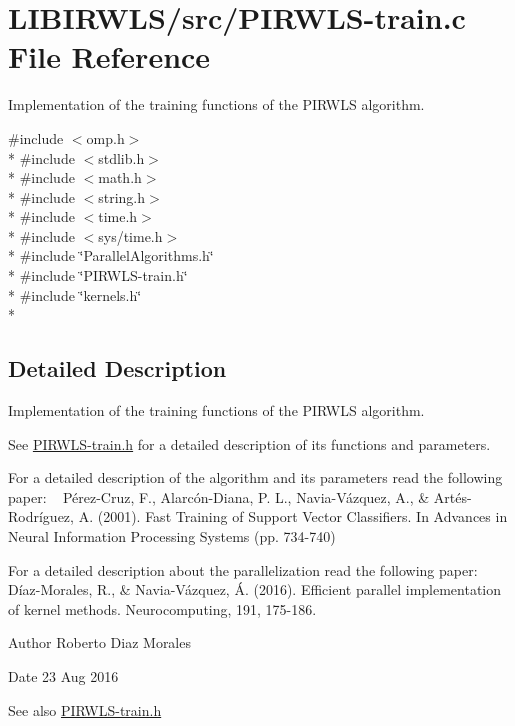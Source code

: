 \hypertarget{PIRWLS-train_8c}{}\section{L\+I\+B\+I\+R\+W\+L\+S/src/\+P\+I\+R\+W\+L\+S-\/train.c File Reference}
\label{PIRWLS-train_8c}


Implementation of the training functions of the P\+I\+R\+W\+LS algorithm.  


{\ttfamily \#include $<$omp.\+h$>$}\\*
{\ttfamily \#include $<$stdlib.\+h$>$}\\*
{\ttfamily \#include $<$math.\+h$>$}\\*
{\ttfamily \#include $<$string.\+h$>$}\\*
{\ttfamily \#include $<$time.\+h$>$}\\*
{\ttfamily \#include $<$sys/time.\+h$>$}\\*
{\ttfamily \#include \char`\"{}Parallel\+Algorithms.\+h\char`\"{}}\\*
{\ttfamily \#include \char`\"{}P\+I\+R\+W\+L\+S-\/train.\+h\char`\"{}}\\*
{\ttfamily \#include \char`\"{}kernels.\+h\char`\"{}}\\*


\subsection{Detailed Description}
Implementation of the training functions of the P\+I\+R\+W\+LS algorithm. 

See \hyperlink{PIRWLS-train_8h}{P\+I\+R\+W\+L\+S-\/train.\+h} for a detailed description of its functions and parameters.

For a detailed description of the algorithm and its parameters read the following paper\+: ~\newline
 Pérez-\/\+Cruz, F., Alarcón-\/\+Diana, P. L., Navia-\/\+Vázquez, A., \& Artés-\/\+Rodríguez, A. (2001). Fast Training of Support Vector Classifiers. In Advances in Neural Information Processing Systems (pp. 734-\/740)

For a detailed description about the parallelization read the following paper\+: ~\newline
Díaz-\/\+Morales, R., \& Navia-\/\+Vázquez, Á. (2016). Efficient parallel implementation of kernel methods. Neurocomputing, 191, 175-\/186.

\begin{DoxyAuthor}{Author}
Roberto Diaz Morales 
\end{DoxyAuthor}
\begin{DoxyDate}{Date}
23 Aug 2016 
\end{DoxyDate}
\begin{DoxySeeAlso}{See also}
\hyperlink{PIRWLS-train_8h}{P\+I\+R\+W\+L\+S-\/train.\+h} 
\end{DoxySeeAlso}
